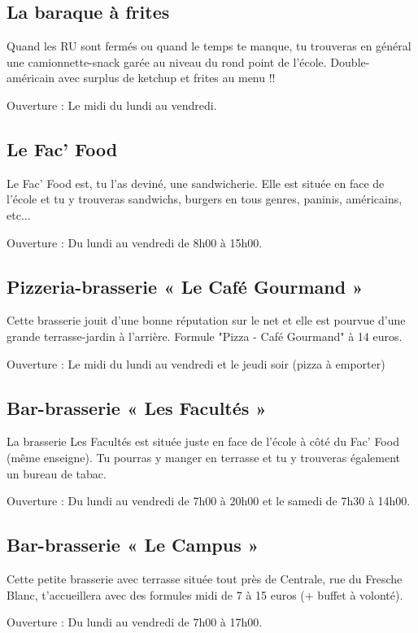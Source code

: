 \subsection{La baraque à frites}
Quand les RU sont fermés ou quand le temps te manque, tu trouveras en général une camionnette-snack garée au niveau du rond point de l'école.
Double-américain avec surplus de ketchup et frites au menu !!

Ouverture : Le midi du lundi au vendredi.

\subsection{Le Fac' Food}

Le Fac' Food est, tu l'as deviné, une sandwicherie. Elle est située en face de l'école et tu y trouveras sandwichs, burgers en tous genres, paninis, américains, etc...

Ouverture : Du lundi au vendredi de 8h00 à 15h00.

\subsection{Pizzeria-brasserie « Le Café Gourmand »}

Cette brasserie jouit d'une bonne réputation sur le net et elle est pourvue d'une grande terrasse-jardin à l'arrière.
Formule "Pizza - Café Gourmand" à 14 euros.

Ouverture : Le midi du lundi au vendredi et le jeudi soir (pizza à emporter)

\subsection{Bar-brasserie « Les Facultés »}
La brasserie Les Facultés est située juste en face de l'école à côté du Fac' Food (même enseigne).
Tu pourras y manger en terrasse et tu y trouveras également un bureau de tabac.

Ouverture :     Du lundi au vendredi de 7h00 à 20h00 et le samedi de 7h30 à 14h00.

\subsection{Bar-brasserie « Le Campus »}
Cette petite brasserie avec terrasse située tout près de Centrale, rue du Fresche Blanc, t'accueillera avec des formules midi de 7 à 15 euros (+ buffet à volonté).

Ouverture :     Du lundi au vendredi de 7h00 à 17h00.


